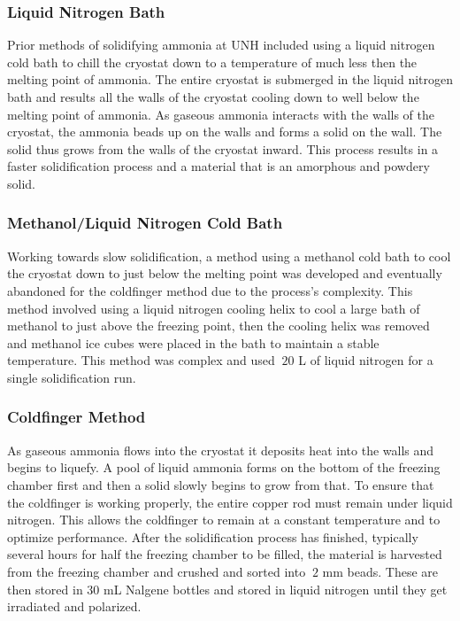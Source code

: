\documentclass[12pt,notitlepage]{amsart}
\begin{document}
  \subsubsection{Liquid Nitrogen Bath}
  Prior methods of solidifying ammonia at UNH included using a liquid nitrogen cold bath to chill the cryostat down to a temperature of much less then the melting point of ammonia. The entire cryostat is submerged in the liquid nitrogen bath and results all the walls of the cryostat cooling down to well below the melting point of ammonia. As gaseous ammonia interacts with the walls of the cryostat, the ammonia beads up on the walls and forms a solid on the wall. The solid thus grows from the walls of the cryostat inward. This process results in a faster solidification process and a material that is an amorphous and powdery solid. 
  \subsubsection{Methanol/Liquid Nitrogen Cold Bath}  
  Working towards slow solidification, a method using a methanol cold bath to cool the cryostat down to just below the melting point was developed and eventually abandoned for the coldfinger method due to the process's complexity. This method involved using a liquid nitrogen cooling helix to cool a large bath of methanol to just above the freezing point, then the cooling helix was removed and methanol ice cubes were placed in the bath to maintain a stable temperature. This method was complex and used $~20$ L of liquid nitrogen for a single solidification run. 
    \subsubsection{Coldfinger Method}
  As gaseous ammonia flows into the cryostat it deposits heat into the walls and begins to liquefy. A pool of liquid ammonia forms on the bottom of the freezing chamber first and then a solid slowly begins to grow from that. To ensure that the coldfinger is working properly, the entire copper rod must remain under liquid nitrogen. This allows the coldfinger to remain at a constant temperature and to optimize performance. After the solidification process has finished, typically several hours for half the freezing chamber to be filled, the material is harvested from the freezing chamber and crushed and sorted into $~2$ mm beads. These are then stored in $30$ mL Nalgene bottles and stored in liquid nitrogen until they get irradiated and polarized. 
\end{document}
